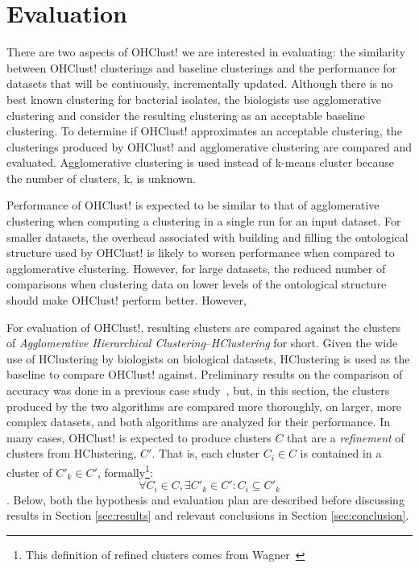 \documentclass[12pt]{ucthesis}
\begin{document}
\chapter{Evaluation}\label{chap:evaluation}
   There are two aspects of \textsf{OHClust!} we are interested in evaluating:
   the similarity between \textsf{OHClust!} clusterings and baseline
   clusterings and the performance for datasets that will be contiuously,
   incrementally updated. Although there is no best known clustering for
   bacterial isolates, the biologists use \textsf{agglomerative clustering} and
   consider the resulting clustering as an acceptable baseline clustering. To
   determine if \textsf{OHClust!} approximates an acceptable clustering, the
   clusterings produced by \textsf{OHClust!} and \textsf{agglomerative
   clustering} are compared and evaluated. \textsf{Agglomerative clustering} is
   used instead of \textsf{k-means cluster} because the number of clusters, k,
   is unknown. 

   Performance of \textsf{OHClust!} is expected to be similar to that of
   \textsf{agglomerative clustering} when computing a clustering in a single
   run for an input dataset. For smaller datasets, the overhead associated with
   building and filling the ontological structure used by \textsf{OHClust!} is
   likely to worsen performance when compared to \textsf{agglomerative
   clustering}. However, for large datasets, the reduced number of comparisons
   when clustering data on lower levels of the ontological structure should
   make \textsf{OHClust!} perform better. However, 


   For evaluation of \textsf{OHClust!}, resulting clusters are compared against the
   clusters of \textit{Agglomerative Hierarchical
   Clustering}--\textit{HClustering} for short. Given the wide use of
   HClustering by biologists on biological datasets, HClustering is used as
   the baseline to compare \textsf{OHClust!} against. Preliminary results on the
   comparison of accuracy was done in a previous case
   study~\cite{Montana:ChronoCluster}, but, in this section, the
   clusters produced by the two algorithms are compared more thoroughly, on larger, more
   complex datasets, and both algorithms are analyzed for their performance. In many
   cases, \textsf{OHClust!} is expected to produce clusters $C$ that are a
   \textit{refinement} of clusters from HClustering, $C'$. That is, each
   cluster $C_i \in C$ is contained in a cluster of $C'_k \in C'$,
   formally\footnote{This definition of refined clusters comes from
   Wagner~\cite{Wagner:Overview}}:
   $$\forall C_i \in C, \exists C'_k \in C' : C_i \subseteq C'_k$$.
   Below, both the hypothesis and evaluation plan are described before discussing
   results in Section \ref{sec:results} and relevant conclusions in Section
   \ref{sec:conclusion}.
\end{document}
